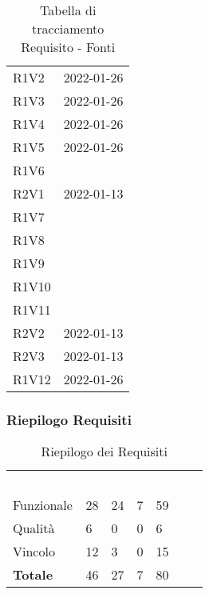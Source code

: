 \begin{table}[!htbp]
\begin{tabular}[t]{ m{}<{\centering}  m{}<{\centering} }
	R1V2 & \Ve{} 2022-01-26 \\	
	 
	R1V3 & \Ve{} 2022-01-26 \\	

	R1V4 & \Ve{} 2022-01-26 \\	
	 
	R1V5 & \Ve{} 2022-01-26 \\	
	 
	R1V6 & \Ca \\	
	 
	R2V1 & \Vi{} 2022-01-13 \\
	
	R1V7 & \Ca \\	
	 
	R1V8 & \Ca \\	 
	
	R1V9 & \Ca \\	
	
	R1V10 & \Ca \\
	
	R1V11 & \Ca \\

	R2V2 & \Vi{} 2022-01-13 \\	
	 
	R2V3 & \Vi{} 2022-01-13 \\	
	 
	R1V12 & \Ve{} 2022-01-26 \\	


\end{tabular}
\caption{Tabella di tracciamento Requisito - Fonti}
\end{table}

\subsubsection{Riepilogo Requisiti}

\begin{table}[!htbp]
\renewcommand{\arraystretch}{1.5}
\begin{tabular}{ m{}<{\centering}  m{}<{\centering}  m{}<{\centering}  m{}<{\centering}  m{}<{\centering} }
	\rowcolor{darkblue}
	\textcolor{white}{\textbf{Tipologia}} &\textcolor{white}{\textbf{\Ob}}& \textcolor{white}{\textbf{\De}} & \textcolor{white}{\textbf{\Fa}}&\textcolor{white}{\textbf{Totale}}\\ 
	Funzionale & 28 & 24 & 7 & 59\\	
	Qualità & 6 & 0 & 0 & 6 \\	
	Vincolo & 12 & 3 & 0 & 15 \\	
	\textbf{Totale} & 46 & 	27 & 7 & 80
\end{tabular}
\caption{Riepilogo dei Requisiti}
\end{table}